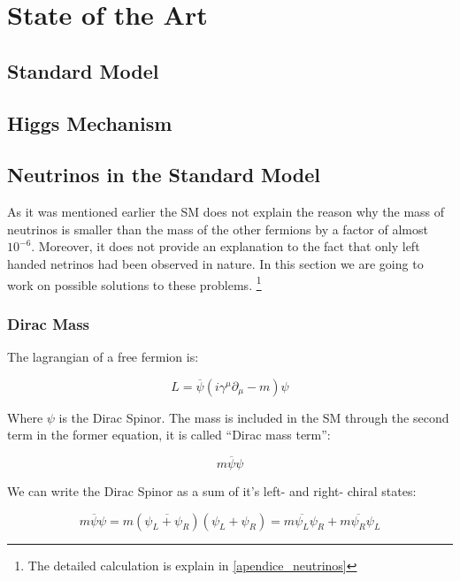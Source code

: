 \chapter{State of the Art} 

\section{Standard Model}

\section{Higgs Mechanism}

\section{Neutrinos in the Standard Model}

As it was mentioned earlier the SM does not explain the reason why the mass of neutrinos is smaller than the mass of the other fermions by a factor of almost $10^{-6}$. Moreover, it does not
provide an explanation to the fact that only left handed netrinos had been observed in nature. 
In this section we are going to work on possible solutions to these problems. \footnote{The detailed calculation is explain in \ref{apendice_neutrinos}}

\subsection{Dirac Mass}
The lagrangian of a free fermion is:

\begin{equation}
 L = \overline{\psi} \left( i \gamma ^\mu \partial_{\mu} - m \right) \psi
\end{equation}

Where $\psi$ is the Dirac Spinor. The mass is included in the SM through the second term in the former equation, it is called ``Dirac mass term'':

\begin{equation}
 m \overline{\psi} \psi
\end{equation}

We can write the Dirac Spinor as a sum of it's left- and right- chiral states:

\begin{equation}
 m \overline{\psi} \psi = m \left( \overbar{\psi_L + \psi_R} \right) \left( \psi_L + \psi_R \right) = m \overline{\psi_L} \psi_R + m \overline{\psi_R}\psi_L
\end{equation} \label{Dirac mass term}

